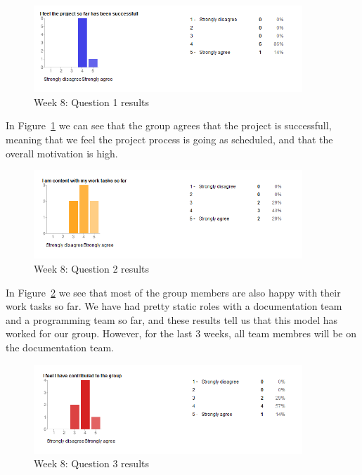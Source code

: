 \begin{figure}[th!]
\centering
\includegraphics[width=0.9\textwidth]{evaluation/week_8_images/project_successfull}
\caption{Week 8: Question 1 results}
\label{fig:W8Q1}
\end{figure}

In Figure~\ref{fig:W8Q1} we can see that the group agrees that the project is successfull, meaning that we feel the project process is going as scheduled, and that the overall motivation is high. 

\begin{figure}[th!]
\centering
\includegraphics[width=0.9\textwidth]{evaluation/week_8_images/work_tasks}
\caption{Week 8: Question 2 results}
\label{fig:W8Q2}
\end{figure}

In Figure~\ref{fig:W8Q2} we see that most of the group members are also happy with their work tasks so far. We have had pretty static roles with a documentation team and a programming team so far, and these results tell us that this model has worked for our group. However, for the last 3 weeks, all team membres will be on the documentation team.

\begin{figure}[th!]
\centering
\includegraphics[width=0.9\textwidth]{evaluation/week_8_images/contributed_group}
\caption{Week 8: Question 3 results}
\label{fig:W8Q3}
\end{figure}

